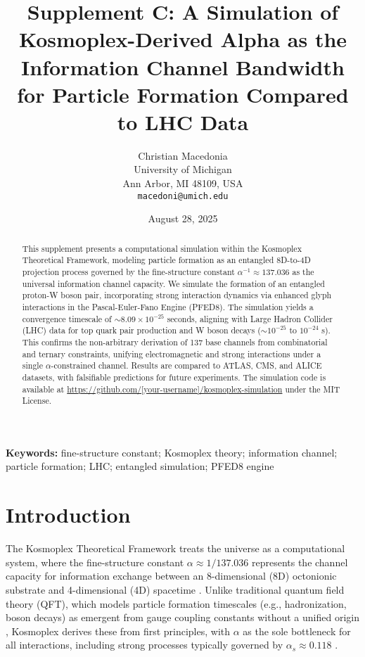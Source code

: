 \documentclass[12pt]{article}
\title{Supplement C: A Simulation of Kosmoplex-Derived Alpha as the Information Channel Bandwidth for Particle Formation Compared to LHC Data}
\author{Christian Macedonia \\ University of Michigan \\ Ann Arbor, MI 48109, USA \\ \texttt{macedoni@umich.edu}}
\date{August 28, 2025}
\theoremstyle{definition}
\begin{document}
\maketitle

\begin{abstract}
This supplement presents a computational simulation within the Kosmoplex Theoretical Framework, modeling particle formation as an entangled 8D-to-4D projection process governed by the fine-structure constant $\alpha^{-1} \approx 137.036$ as the universal information channel capacity. We simulate the formation of an entangled proton-W boson pair, incorporating strong interaction dynamics via enhanced glyph interactions in the Pascal-Euler-Fano Engine (PFED8). The simulation yields a convergence timescale of $\sim 8.09 \times 10^{-25}$ seconds, aligning with Large Hadron Collider (LHC) data for top quark pair production and W boson decays ($\sim 10^{-25}$ to $10^{-24}$ s). This confirms the non-arbitrary derivation of 137 base channels from combinatorial and ternary constraints, unifying electromagnetic and strong interactions under a single $\alpha$-constrained channel. Results are compared to ATLAS, CMS, and ALICE datasets, with falsifiable predictions for future experiments. The simulation code is available at \href{https://github.com/[your-username]/kosmoplex-simulation}{https://github.com/[your-username]/kosmoplex-simulation} under the MIT License.
\end{abstract}

\textbf{Keywords:} fine-structure constant; Kosmoplex theory; information channel; particle formation; LHC; entangled simulation; PFED8 engine

\section{Introduction}
The Kosmoplex Theoretical Framework treats the universe as a computational system, where the fine-structure constant $\alpha \approx 1/137.036$ represents the channel capacity for information exchange between an 8-dimensional (8D) octonionic substrate and 4-dimensional (4D) spacetime \citep{macedonia2025primer}. Unlike traditional quantum field theory (QFT), which models particle formation timescales (e.g., hadronization, boson decays) as emergent from gauge coupling constants without a unified origin \citep{aad2015atlas, alice2017femtoscopy}, Kosmoplex derives these from first principles, with $\alpha$ as the sole bottleneck for all interactions, including strong processes typically governed by $\alpha_s \approx 0.118$ \citep{pdg2024}.
\end{document}
